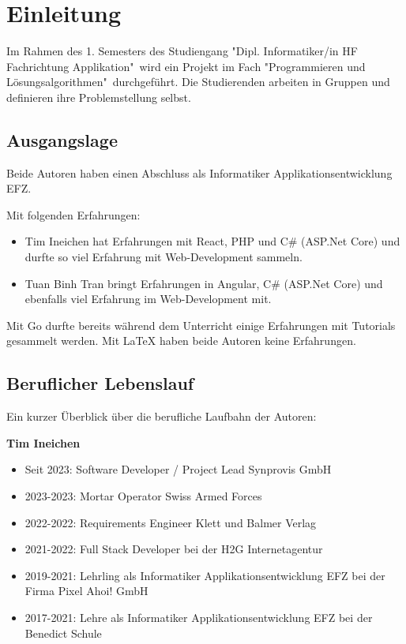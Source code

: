 \section{Einleitung}
Im Rahmen des 1. Semesters des Studiengang "Dipl.
Informatiker/in HF Fachrichtung Applikation"\  wird ein Projekt im Fach "Programmieren und Lösungsalgorithmen"\ durchgeführt. Die Studierenden arbeiten in Gruppen und definieren ihre Problemstellung selbst.

\subsection{Ausgangslage}

Beide Autoren haben einen Abschluss als Informatiker Applikationsentwicklung EFZ. 

Mit folgenden Erfahrungen:

\begin{itemize}
    \item Tim Ineichen hat Erfahrungen mit React, PHP und C\# (ASP.Net Core) und durfte so viel Erfahrung mit Web-Development sammeln.
    \item Tuan Binh Tran bringt Erfahrungen in Angular, C\# (ASP.Net Core) und ebenfalls viel Erfahrung im Web-Development mit.
\end{itemize}

\noindent Mit Go durfte bereits während dem Unterricht einige Erfahrungen mit Tutorials gesammelt werden. Mit LaTeX haben beide Autoren keine Erfahrungen.


\subsection{Beruflicher Lebenslauf}

Ein kurzer Überblick über die berufliche Laufbahn der Autoren:
\newline

\textbf{Tim Ineichen}
\begin{itemize}
    \item Seit 2023: Software Developer / Project Lead Synprovis GmbH
    \item 2023-2023: Mortar Operator Swiss Armed Forces
    \item 2022-2022: Requirements Engineer Klett und Balmer Verlag
    \item 2021-2022: Full Stack Developer bei der H2G Internetagentur
    \item 2019-2021: Lehrling als Informatiker Applikationsentwicklung EFZ bei der Firma Pixel Ahoi! GmbH
    \item 2017-2021: Lehre als Informatiker Applikationsentwicklung EFZ bei der Benedict Schule
\end{itemize}

